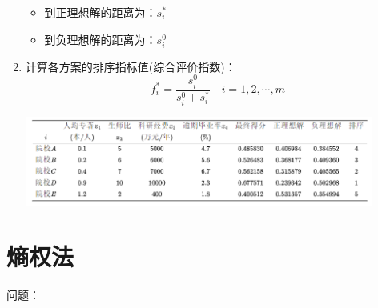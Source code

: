 \documentclass[12pt,a4paper]{article}
\begin{document}
\begin{enumerate}
  \begin{itemize}
    \item 到正理想解的距离为：$s_i^*$
    \item 到负理想解的距离为：$s_i^0$
  \end{itemize}
  \item 计算各方案的排序指标值(综合评价指数)：
  $$f_i^* = \frac{s_i^0}{s_i^0 + s_i^*}\quad i = 1, 2, \cdots ,m$$
  \begin{center}
    \includegraphics[width = 0.9\textwidth]{figures/topsis_finalresult.png}
  \end{center}
\end{enumerate}

\section{熵权法}
问题：
\end{document}
